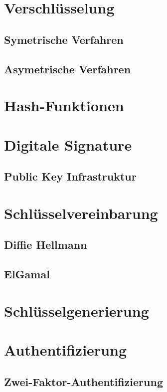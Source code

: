\documentclass[10pt, a4paper]{scrreprt}
\begin{document}
\section{Verschlüsselung}
\subsection{Symetrische Verfahren}
\subsection{Asymetrische Verfahren}

\section{Hash-Funktionen}
\section{Digitale Signature}
\subsection{Public Key Infrastruktur}
\section{Schlüsselvereinbarung}
\subsection{Diffie Hellmann}
\subsection{ElGamal}
\section{Schlüsselgenerierung}
\section{Authentifizierung}
\subsection{Zwei-Faktor-Authentifizierung}


\end{document}
